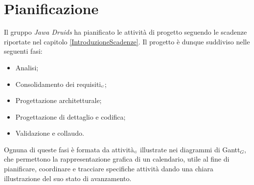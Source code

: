 \chapter{Pianificazione}\label{Pianificazione}
Il gruppo \textit{Jawa Druids} ha pianificato le attività di progetto seguendo le scadenze riportate nel capitolo \ref{IntroduzioneScadenze}. Il progetto è dunque suddiviso nelle seguenti fasi:
\begin{itemize}
	\item Analisi;
	\item Consolidamento dei requisiti$_{\scaleto{G}{3pt}}$;
	\item Progettazione architetturale;
	\item Progettazione di dettaglio e codifica;
	\item Validazione e collaudo.
\end{itemize}
Ognuna di queste fasi è formata da attività$_{\scaleto{G}{3pt}}$ illustrate nei diagrammi di Gantt$_G$, che permettono la rappresentazione grafica di un calendario, utile al fine di pianificare, coordinare e tracciare specifiche attività dando una chiara illustrazione del suo stato di avanzamento.
